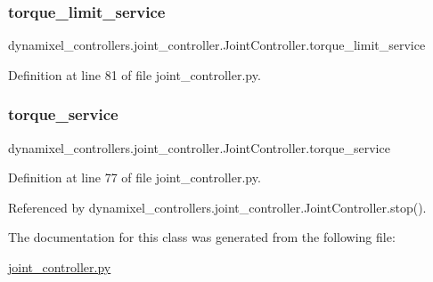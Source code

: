 \subsubsection{\texorpdfstring{torque\+\_\+limit\+\_\+service}{torque\_limit\_service}}
{\footnotesize\ttfamily dynamixel\+\_\+controllers.\+joint\+\_\+controller.\+Joint\+Controller.\+torque\+\_\+limit\+\_\+service}



Definition at line 81 of file joint\+\_\+controller.\+py.

\mbox{\label{classdynamixel__controllers_1_1joint__controller_1_1_joint_controller_ac033f7205e272cceafd190ad66dbd71e}} 
\subsubsection{\texorpdfstring{torque\+\_\+service}{torque\_service}}
{\footnotesize\ttfamily dynamixel\+\_\+controllers.\+joint\+\_\+controller.\+Joint\+Controller.\+torque\+\_\+service}



Definition at line 77 of file joint\+\_\+controller.\+py.



Referenced by dynamixel\+\_\+controllers.\+joint\+\_\+controller.\+Joint\+Controller.\+stop().



The documentation for this class was generated from the following file\+:\begin{DoxyCompactItemize}
\item 
\hyperlink{joint__controller_8py}{joint\+\_\+controller.\+py}\end{DoxyCompactItemize}
